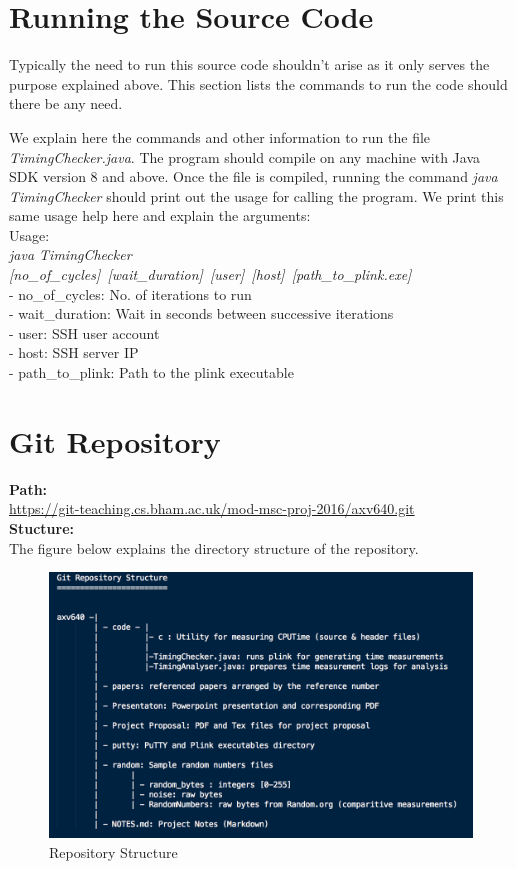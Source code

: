 \documentclass{bhamthesis}
\begin{document}
\begin{appendices}
\chapter{Running the Source Code}
Typically the need to run this source code shouldn't arise as it only serves the purpose explained above. This section lists the commands to run the code should there be any need.\par
We explain here the commands and other information to run the file \textit{TimingChecker.java}. The program should compile on any machine with Java SDK version 8 and above. Once the file is compiled, running the command \textit{java TimingChecker} should print out the usage for calling the program. We print this same usage help here and explain the arguments: \\
Usage:\\
 \textit{java TimingChecker [no\_of\_cycles]\ [wait\_duration]\ [user]\ [host]\ [path\_to\_plink.exe]} \\
    - no\_of\_cycles: No. of iterations to run\\
    - wait\_duration: Wait in seconds between successive iterations\\
    - user: SSH user account\\
    - host: SSH server IP\\
    - path\_to\_plink: Path to the plink executable \\
\chapter{Git Repository}
\textbf{Path:}\\
\url{https://git-teaching.cs.bham.ac.uk/mod-msc-proj-2016/axv640.git}\\
\linebreak
\textbf{Stucture:}\\
The figure below explains the directory structure of the repository.
\begin{figure}[ht]
\caption{Repository Structure}
\centering
\includegraphics[width=1\textwidth]{RepoStructure.png}
\end{figure}

\end{appendices}
\end{document}
